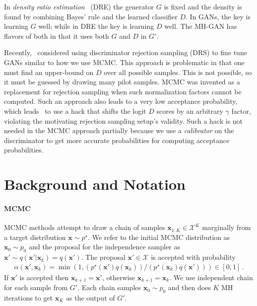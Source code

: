 \documentclass{article}
\renewcommand{\vec}[1]{{\boldsymbol{\mathbf{#1}}}} %
\newcommand{\set}[1]{\mathcal{#1}}
\newcommand{\sample}{\sim}
\newcommand{\given}{|}
\newcommand{\target}{{p^\star}}
\newcommand{\prop}{q}
\newcommand{\pinit}{{p_0}}
\newcommand{\accept}{\alpha}
\newcommand{\setx}{\set{X}}
\begin{document}
In \emph{density ratio estimation}~\citep{Sugiyama2012} (DRE) the generator $G$ is fixed and the density is found by combining Bayes' rule and the learned classifier $D$.
In GANs, the key is learning $G$ well; while in DRE the key is learning $D$ well.
The MH-GAN has flavors of both in that it uses both $G$ and $D$ in $G'$.

Recently,~\citet{Azadi2018} considered using discriminator rejection sampling (DRS) to fine tune GANs similar to how we use MCMC\@.
This approach is problematic in that one must find an upper-bound on $D$ over all possible samples.
This is not possible, so it must be guessed by drawing many pilot samples.
MCMC was invented as a replacement for rejection sampling when such normalization factors cannot be computed.
Such an approach also leads to a very low acceptance probability, which leads~\citet{Azadi2018} to use a hack that shifts the logit $D$ scores by an arbitrary $\gamma$ factor, violating the motivating rejection sampling setup's validity.
Such a hack is not needed in the MCMC approach partially because we use a \emph{calibrator} on the discriminator to get more accurate probabilities for computing acceptance probabilities.

\section{Background and Notation}
\label{sec:Background}

\paragraph{MCMC}
MCMC methods attempt to draw a chain of samples $\vec x_{1:K} \in \setx^K$ marginally from a target distribution $\vec x \sample \target$.
We refer to the initial MCMC distribution as $\vec x_0 \sample \pinit$ and the proposal for the independence sampler as $\vec x' \sample \prop(\vec x' \given \vec x_k)=\prop(\vec x')$.
The proposal $\vec x' \in \setx$ is accepted with probability
\begin{align}
  \accept(\vec x', \vec x_k) = \min\left(1, (\target(\vec x')\prop(\vec x_k))/(\target(\vec x_k)\prop(\vec x'))\right) \in [0,1]\,. \label{eq:alpha def}
\end{align}
If $\vec x'$ is accepted then $\vec x_{k+1} = \vec x'$, otherwise $\vec x_{k+1} = \vec x_k$.
We use independent chain for each sample from $G'$.
Each chain samples $\vec x_0 \sample \pinit$ and then does $K$ MH iterations to get $\vec x_K$ as the output of $G'$.
\end{document}
